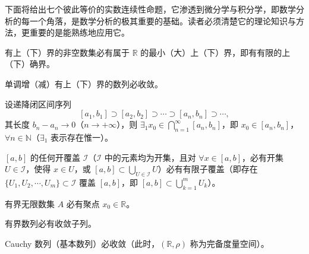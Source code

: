 下面将给出七个彼此等价的实数连续性命题，它渗透到微分学与积分学，即数学分析的每一个角落，是数学分析的极其重要的基础。读者必须清楚它的理论知识与方法，更重要的是能熟练地应用它。

\begin{proposition}\label{prop:cont:1}
有上（下）界的非空数集必有属于 $\mathbb{R}$ 的最小（大）上（下）界，即有有限的上（下）确界。
\end{proposition}

\begin{proposition}\label{prop:cont:2}
单调增（减）有上（下）界的数列必收敛。
\end{proposition}

\begin{proposition}\label{prop:cont:3}
设递降闭区间序列
\[
[a_1, b_1] \supset [a_2, b_2] \supset \cdots \supset [a_n, b_n] \supset \cdots,
\]
其长度 $b_n - a_n \to 0$（$n \to +\infty$），则 $\exists_1 x_0 \in \bigcap\limits_{n=1}^\infty [a_n, b_n]$，即 $x_0 \in [a_n, b_n]$，$\forall n \in \mathbb{N}$（$\exists_1$ 表示存在惟一）。
\end{proposition}

\begin{proposition}\label{prop:cont:4}
$[a,b]$ 的任何开覆盖 $\mathcal{I}$（$\mathcal{I}$ 中的元素均为开集，且对 $\forall x \in [a,b]$，必有开集 $U \in \mathcal{I}$，使得 $x \in U$，或 $[a,b] \subset \bigcup\limits_{U \in \mathcal{I}} U$）必有有限子覆盖（即存在 $\{U_1, U_2, \cdots, U_m\} \subset \mathcal{I}$ 覆盖 $[a,b]$，即 $[a,b] \subset \bigcup\limits_{k=1}^m U_k$）。
\end{proposition}

\begin{proposition}\label{prop:cont:5}
有界无限数集 $A$ 必有聚点 $x_0 \in \mathbb{R}$。
\end{proposition}

\begin{proposition}\label{prop:cont:6}
有界数列必有收敛子列。
\end{proposition}

\begin{proposition}\label{prop:cont:7}
Cauchy 数列（基本数列）必收敛（此时，$(\mathbb{R}, \rho)$ 称为完备度量空间）。
\end{proposition}

